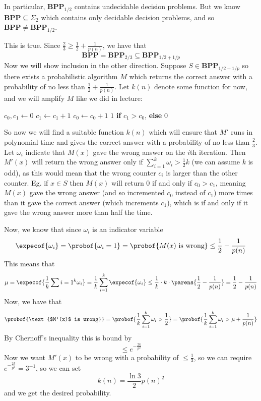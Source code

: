 \documentclass[10pt]{article}
\def\BPP{\mathbf{BPP}}
\begin{document}
    In particular, $\BPP_{1/2}$ contains undecidable decision problems.
    But we know $\BPP\subseteq\Sigma_2$ which contains only decidable decision problems, and so $\BPP\neq\BPP_{1/2}$.

    \item This is true.
    Since $\frac23\geq\frac12+\frac1{p(n)}$, we have that
    \[ \BPP = \BPP_{2/3} \subseteq \BPP_{1/2+1/p} \]
    Now we will show inclusion in the other direction.
    Suppose $S\in\BPP_{1/2+1/p}$ so there exists a probabilistic algorithm $M$ which returns the correct answer with a probability of no less than $\frac12+\frac1{p(n)}$.
    Let $k(n)$ denote some function for now, and we will amplify $M$ like we did in lecture:

    \algorithm
            \State $c_0,c_1\gets0$
                 $c_1\gets c_1+1$
                \lElse $c_0\gets c_0+1$
            \EndRepeat
            \State\Return $1$ \textbf{if} $c_1>c_0$, \textbf{else} $0$
        \EndFunc
    \ealgorithm

    So now we will find a suitable function $k(n)$ which will ensure that $M'$ runs in polynomial time and gives the correct answer with a probability of no less than $\frac23$.
    Let $\omega_i$ indicate that $M(x)$ gave the wrong answer on the $i$th iteration.
    Then $M'(x)$ will return the wrong answer only if $\sum_{i=1}^k\omega_i>\frac12k$ (we can assume $k$ is odd), as this would mean that the wrong counter $c_i$ is larger than the other counter.
    Eg. if $x\in S$ then $M(x)$ will return $0$ if and only if $c_0>c_1$, meaning $M(x)$ gave the wrong answer (and so incremented $c_0$ instead of $c_1$) more times than it gave the correct answer
    (which increments $c_1$), which is if and only if it gave the wrong answer more than half the time.

    Now, we know that since $\omega_i$ is an indicator variable
    \[ \expecof{\omega_i} = \probof{\omega_i=1} = \probof{M(x)\text{ is wrong}} \leq \frac12 - \frac1{p(n)} \]
    This means that
    \[ \mu = \expecof{\frac1k\sum{i=1}^k\omega_i} = \frac1k\sum_{i=1}^k\expecof{\omega_i} \leq \frac1k\cdot k\cdot\parens{\frac12-\frac1{p(n)}} = \frac12-\frac1{p(n)} \]
    Now, we have that
    \[ \probof{\text{$M'(x)$ is wrong}} = \probof{\frac1k\sum_{i=1}^k\omega_i>\frac12} = \probof{\frac1k\sum_{i=1}^k\omega_i>\mu+\frac1{p(n)}} \]
    By Chernoff's inequality this is bound by
    \[ \leq e^{-\frac{2k}{p^2}} \]
    Now we want $M'(x)$ to be wrong with a probability of $\leq\frac13$, so we can require $e^{-\frac{2k}{p^2}}=3^{-1}$, so we can set
    \[ k(n) = \frac{\ln3}2p(n)^2 \]
    and we get the desired probability.
\end{document}
